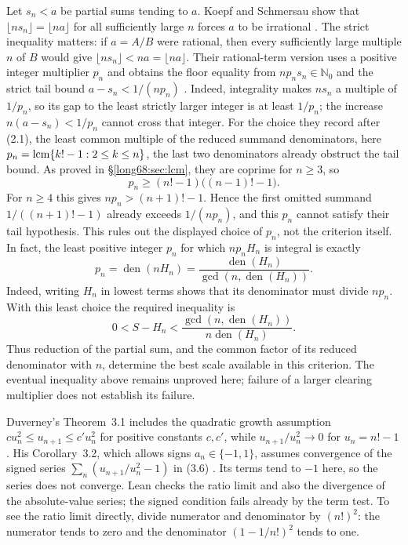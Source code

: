 \documentclass[11pt]{article}
\newcommand{\den}{\operatorname{den}}
\begin{document}
Let $s_n<a$ be partial sums tending to $a$. Koepf and Schmersau show that
$\lfloor ns_n\rfloor=\lfloor na\rfloor$ for all sufficiently large $n$
forces $a$ to be irrational \cite[Thm.~1.1, p.~117]{koepf-schmersau}.
The strict inequality matters: if $a=A/B$ were rational, then every
sufficiently large multiple $n$ of $B$ would give
$\lfloor ns_n\rfloor<na=\lfloor na\rfloor$. Their rational-term version
uses a positive integer multiplier $p_n$ and obtains the floor equality
from $np_ns_n\in\mathbb N_0$ and the strict tail bound
$a-s_n<1/(np_n)$
\cite[(2.1) and (2.3), p.~118; Thms.~2.2--2.3, pp.~119--120]{koepf-schmersau}.
Indeed, integrality makes $ns_n$ a multiple of $1/p_n$, so its gap to the
least strictly larger integer is at least $1/p_n$; the increase
$n(a-s_n)<1/p_n$ cannot cross that integer.
For the choice they record after (2.1), the least common multiple of the
reduced summand denominators, here $p_n=\operatorname{lcm}\{k!-1:2\le k\le n\}$, the last
two denominators already obstruct the tail bound. As proved in
\S\ref{long68:sec:lcm}, they are coprime for $n\ge3$, so
\[
 p_n\ge(n!-1)\bigl((n-1)!-1\bigr).
\]
For $n\ge4$ this gives $np_n>(n+1)!-1$. Hence the first omitted summand
$1/((n+1)!-1)$ already exceeds $1/(np_n)$, and this $p_n$ cannot satisfy
their tail hypothesis. This rules out the displayed choice of $p_n$, not
the criterion itself. In fact, the least positive integer $p_n$ for which
$np_nH_n$ is integral is exactly
\[
 p_n=\den(nH_n)
     =\frac{\den(H_n)}{\gcd(n,\den(H_n))}.
\]
Indeed, writing $H_n$ in lowest terms shows that its denominator must
divide $np_n$. With this least choice the required inequality is
\[
 0<S-H_n<\frac{\gcd(n,\den(H_n))}{n\den(H_n)}.
\]
Thus reduction of the partial sum, and the common factor of its reduced
denominator with $n$, determine the best scale available in this
criterion. The eventual inequality above remains unproved here; failure
of a larger clearing multiplier does not establish its failure.

Duverney's Theorem~3.1 includes the quadratic growth assumption
$cu_n^2\le u_{n+1}\le c'u_n^2$ for positive constants $c,c'$, while
$u_{n+1}/u_n^2\to0$ for $u_n=n!-1$
\cite[(1.3), p.~275; Thm.~3.1, pp.~285--286]{duverney}.
His Corollary~3.2, which allows signs $a_n\in\{-1,1\}$, assumes convergence
of the signed series $\sum_n(u_{n+1}/u_n^2-1)$ in (3.6)
\cite[Cor.~3.2, p.~287]{duverney}. Its terms tend to $-1$ here, so the
series does not converge. Lean checks the ratio
limit and also the divergence of the absolute-value series; the signed
condition fails already by the term test. To see the ratio limit directly, divide
numerator and denominator by $(n!)^2$: the numerator tends to zero and
the denominator $(1-1/n!)^2$ tends to one.
\end{document}
